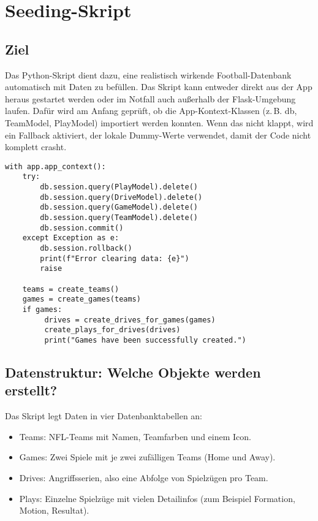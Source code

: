 \section{Seeding-Skript}

\subsection{Ziel}

Das Python-Skript dient dazu, eine realistisch wirkende Football-Datenbank automatisch mit Daten zu befüllen.
Das Skript kann entweder direkt aus der App heraus gestartet werden oder im Notfall auch außerhalb der Flask-Umgebung laufen. Dafür wird am Anfang geprüft, ob die App-Kontext-Klassen (z. B. db, TeamModel, PlayModel) importiert werden konnten. Wenn das nicht klappt, wird ein Fallback aktiviert, der lokale Dummy-Werte verwendet, damit der Code nicht komplett crasht.

\begin{verbatim}
with app.app_context():
    try:
        db.session.query(PlayModel).delete()
        db.session.query(DriveModel).delete()
        db.session.query(GameModel).delete()
        db.session.query(TeamModel).delete()
        db.session.commit()
    except Exception as e:
        db.session.rollback()
        print(f"Error clearing data: {e}")
        raise

    teams = create_teams()
    games = create_games(teams)
    if games:
         drives = create_drives_for_games(games)
         create_plays_for_drives(drives)
         print("Games have been successfully created.")
\end{verbatim}

\subsection{Datenstruktur: Welche Objekte werden erstellt?}

Das Skript legt Daten in vier Datenbanktabellen an:
\begin{itemize}
  \item Teams: NFL-Teams mit Namen, Teamfarben und einem Icon.
  \item Games: Zwei Spiele mit je zwei zufälligen Teams (Home und Away).
  \item Drives: Angriffsserien, also eine Abfolge von Spielzügen pro Team.
  \item Plays: Einzelne Spielzüge mit vielen Detailinfos (zum Beispiel Formation, Motion, Resultat).
\end{itemize}


